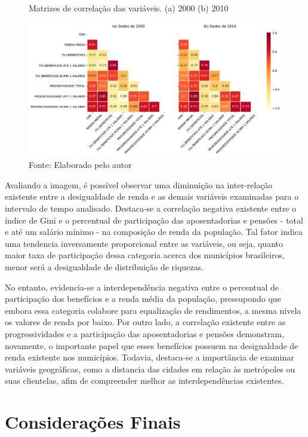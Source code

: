 \begin{figure}[!h]
    \centering
    \caption{Matrizes de correlação das variáveis. (a) 2000 (b) 2010}
    \includegraphics[width=\textwidth]{figs/cap04_corr_matrix.pdf}
    \caption*{\footnotesize{Fonte: Elaborado pelo autor}}
    \label{fig:cap04:matrixcorr}
\end{figure}

Avaliando a imagem, é possível observar uma diminuição na inter-relação existente entre a desigualdade de renda e as demais variáveis examinadas para o intervalo de tempo analisado. Destaca-se a correlação negativa existente entre o índice de Gini e o percentual de participação das aposentadorias e pensões - total e até um salário mínimo - na composição de renda da população. Tal fator indica uma tendencia inversamente proporcional entre as variáveis, ou seja, quanto maior taxa de participação dessa categoria acerca dos municípios brasileiros, menor será a desigualdade de distribuição de riquezas. 

No entanto, evidencia-se a interdependência negativa entre o percentual de participação dos benefícios e a renda média da população, pressupondo que embora essa categoria colabore para equalização de rendimentos, a mesma nivela os valores de renda por baixo. Por outro lado, a correlação existente entre as progressividades e a participação das aposentadorias e pensões demonstram, novamente, o importante papel que esses benefícios possuem na desigualdade de renda existente nos municípios. Todavia, destaca-se a importância de examinar variáveis geográficas, como a distancia das cidades em relação às metrópoles ou suas clientelas, afim de compreender melhor as interdependências existentes.


\section{Considerações Finais}\label{cap04:conclusoes}


